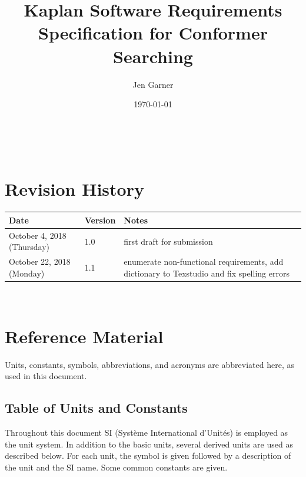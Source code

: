 \documentclass[12pt]{article}
\begin{document}
\title{Kaplan Software Requirements Specification for Conformer Searching} 
\author{Jen Garner}
\date{\today}
	
\maketitle

~\newpage


\section{Revision History}\label{1rev-hist}

\begin{tabularx}{\textwidth}{p{3cm}p{2cm}X}
\toprule {\bf Date} & {\bf Version} & {\bf Notes}\\
\midrule
October 4, 2018 (Thursday) & 1.0 & first draft for 
submission \\
October 22, 2018 (Monday) & 1.1 & enumerate 
non-functional requirements, add dictionary to 
Texstudio and fix spelling errors \\
\bottomrule
\end{tabularx}

~\newpage

\section{Reference Material}

Units, constants, symbols, abbreviations, and acronyms are abbreviated here, as 
used in this document.

\subsection{Table of Units and Constants}

Throughout this document SI (Syst\`{e}me International d'Unit\'{e}s) is employed
as the unit system.  In addition to the basic units, several derived units are
used as described below.  For each unit, the symbol is given followed by a
description of the unit and the SI name. Some common constants are given.
~\newline
\end{document}
